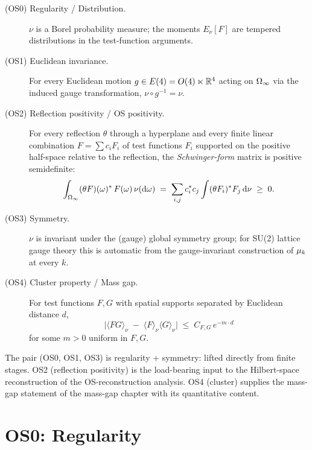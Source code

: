 \begin{description}
  \item[(OS0) Regularity / Distribution.]  $\nu$ is a Borel
    probability measure; the moments $E_\nu[F]$ are tempered
    distributions in the test-function arguments.

  \item[(OS1) Euclidean invariance.]  For every Euclidean motion
    $g \in E(4) = O(4) \ltimes \mathbb{R}^4$ acting on $\Omega_\infty$ via the
    induced gauge transformation, $\nu \circ g^{-1} = \nu$.

  \item[(OS2) Reflection positivity / OS positivity.]  For every
    reflection $\theta$ through a hyperplane and every finite linear
    combination $F = \sum c_i F_i$ of test functions $F_i$ supported
    on the positive half-space relative to the reflection, the
    \emph{Schwinger-form} matrix is positive semidefinite:
    \begin{equation*}
      \int_{\Omega_\infty} (\theta F)(\omega)^* \, F(\omega) \, \nu(\mathrm{d}\omega)
      \;=\;
      \sum_{i, j} c_i^* c_j \int (\theta F_i)^* F_j \, \mathrm{d}\nu
      \;\ge\; 0.
    \end{equation*}

  \item[(OS3) Symmetry.]  $\nu$ is invariant under the (gauge) global
    symmetry group; for SU(2) lattice gauge theory this is automatic
    from the gauge-invariant construction of $\mu_k$ at every $k$.

  \item[(OS4) Cluster property / Mass gap.]  For test functions $F, G$
    with spatial supports separated by Euclidean distance $d$,
    \begin{equation*}
      \bigl| \langle F G \rangle_\nu \;-\; \langle F \rangle_\nu \langle G \rangle_\nu \bigr|
      \;\le\;
      C_{F,G} \, e^{-m \cdot d}
    \end{equation*}
    for some $m > 0$ uniform in $F, G$.
\end{description}

The pair (OS0, OS1, OS3) is regularity + symmetry: lifted directly
from finite stages.  OS2 (reflection positivity) is the load-bearing
input to the Hilbert-space reconstruction of the OS-reconstruction analysis.  OS4
(cluster) supplies the mass-gap statement of the mass-gap chapter with its
quantitative content.

\section{OS0: Regularity}
\label{sec:os0}

